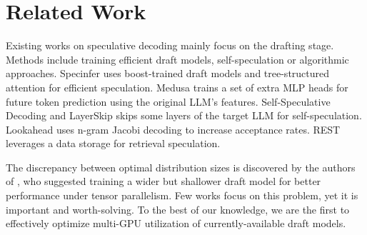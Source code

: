 \section{Related Work}
\label{related_work}

Existing works on speculative decoding mainly focus on the drafting stage. Methods include training efficient draft models, self-speculation or algorithmic approaches. Specinfer \cite{miao2024specinfer} uses boost-trained draft models and tree-structured attention for efficient speculation. Medusa \cite{cai2024medusa} trains a set of extra MLP heads for future token prediction using the original LLM’s features. Self-Speculative Decoding \cite{zhang2023draft} and LayerSkip \cite{elhoushi2024layer} skips some layers of the target LLM for self-speculation. Lookahead \cite{fubreak} uses n-gram Jacobi decoding to increase acceptance rates. REST \cite{he2023rest} leverages a data storage for retrieval speculation.

The discrepancy between optimal distribution sizes is discovered by the authors of \cite{chen2023accelerating}, who suggested training a wider but shallower draft model for better performance under tensor parallelism. Few works focus on this problem, yet it is important and worth-solving. To the best of our knowledge, we are the first to effectively optimize multi-GPU utilization of currently-available draft models.